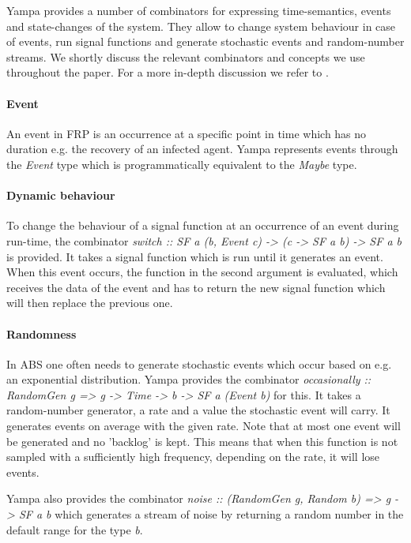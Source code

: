 Yampa provides a number of combinators for expressing time-semantics, events and state-changes of the system. They allow to change system behaviour in case of events, run signal functions and generate stochastic events and random-number streams. We shortly discuss the relevant combinators and concepts we use throughout the paper. For a more in-depth discussion we refer to \cite{hudak_arrows_2003, courtney_yampa_2003, nilsson_functional_2002}.

\paragraph{Event}
An event in FRP is an occurrence at a specific point in time which has no duration e.g. the recovery of an infected agent. Yampa represents events through the \textit{Event} type which is programmatically equivalent to the \textit{Maybe} type. 

\paragraph{Dynamic behaviour}
To change the behaviour of a signal function at an occurrence of an event during run-time, the combinator \textit{switch :: SF a (b, Event c) -> (c -> SF a b) -> SF a b} is provided. It takes a signal function which is run until it generates an event. When this event occurs, the function in the second argument is evaluated, which receives the data of the event and has to return the new signal function which will then replace the previous one.

\paragraph{Randomness}
In ABS one often needs to generate stochastic events which occur based on e.g. an exponential distribution. Yampa provides the combinator \textit{occasionally :: RandomGen g => g -> Time -> b -> SF a (Event b)} for this. It takes a random-number generator, a rate and a value the stochastic event will carry. It generates events on average with the given rate. Note that at most one event will be generated and no 'backlog' is kept. This means that when this function is not sampled with a sufficiently high frequency, depending on the rate, it will lose events.

Yampa also provides the combinator \textit{noise :: (RandomGen g, Random b) => g -> SF a b} which generates a stream of noise by returning a random number in the default range for the type \textit{b}.

